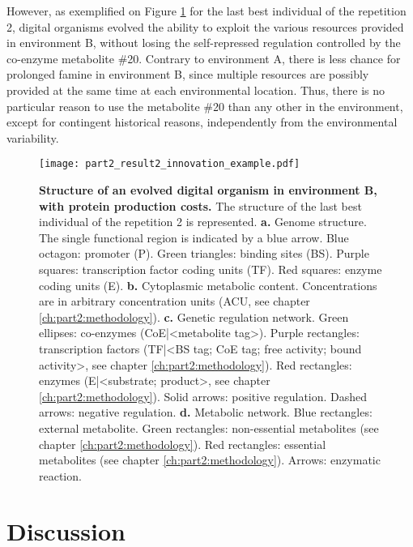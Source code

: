 However, as exemplified on Figure \ref{fig:part2:second_result:innovation_example} for the last best individual of the repetition 2, digital organisms evolved the ability to exploit the various resources provided in environment B, without losing the self-repressed regulation controlled by the co-enzyme metabolite \#20. Contrary to environment A, there is less chance for prolonged famine in environment B, since multiple resources are possibly provided at the same time at each environmental location. Thus, there is no particular reason to use the metabolite \#20 than any other in the environment, except for contingent historical reasons, independently from the environmental variability.

\begin{figure}[!h]
\centering
\texttt{[image: part2\_result2\_innovation\_example.pdf]}
\caption[Structure of an evolved digital organism in environment B, with protein production costs.]
{\textbf{Structure of an evolved digital organism in environment B, with protein production costs.}
The structure of the last best individual of the repetition 2 is represented.
\textbf{a.} Genome structure. The single functional region is indicated by a blue arrow. Blue octagon: promoter (P). Green triangles: binding sites (BS). Purple squares: transcription factor coding units (TF). Red squares: enzyme coding units (E).
\textbf{b.} Cytoplasmic metabolic content. Concentrations are in arbitrary concentration units (ACU, see chapter \ref{ch:part2:methodology}).
\textbf{c.} Genetic regulation network. Green ellipses: co-enzymes (CoE|<metabolite tag>). Purple rectangles: transcription factors (TF|<BS tag; CoE tag; free activity; bound activity>, see chapter \ref{ch:part2:methodology}). Red rectangles: enzymes (E|<substrate; product>, see chapter \ref{ch:part2:methodology}). Solid arrows: positive regulation. Dashed arrows: negative regulation.
\textbf{d.} Metabolic network. Blue rectangles: external metabolite. Green rectangles: non-essential metabolites (see chapter \ref{ch:part2:methodology}). Red rectangles: essential metabolites (see chapter \ref{ch:part2:methodology}). Arrows: enzymatic reaction. 
}
\label{fig:part2:second_result:innovation_example}
\end{figure}


\section{Discussion}
\label{sec:part2:second_result:discussion}

